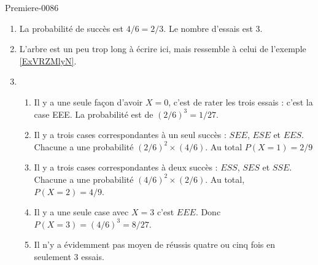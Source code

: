 
\begin{corrige}{Premiere-0086}

    \begin{enumerate}
        \item
            La probabilité de succès est \( 4/6=2/3\). Le nombre d'essais est \( 3\).
        \item
            L'arbre est un peu trop long à écrire ici, mais ressemble à celui de l'exemple \ref{ExVRZMlyN}.
        \item
            \begin{enumerate}
                \item
                    Il y a une seule façon d'avoir \( X=0\), c'est de rater les trois essais : c'est la case EEE. La probabilité est de \( (2/6)^3=1/27\).
                \item
                    Il y a trois cases correspondantes à un seul succès : \( SEE\), \( ESE\) et \( EES\). Chacune a une probabilité \( (2/6)^2\times (4/6)\). Au total \( P(X=1)=2/9\)
                \item
                    Il y a trois cases correspondantes à deux succès : \( ESS\), \( SES\) et \( SSE\). Chacune a une probabilité \( (4/6)^2\times (2/6)\). Au total, \( P(X=2)=4/9\).
                \item
                    Il y a une seule case avec \( X=3\) c'est \( EEE\). Donc \( P(X=3)=(4/6)^3=8/27\).
                \item
                    Il n'y a évidemment pas moyen de réussis quatre ou cinq fois en seulement 3 essais.
            \end{enumerate}
            
    \end{enumerate}

\end{corrige}
